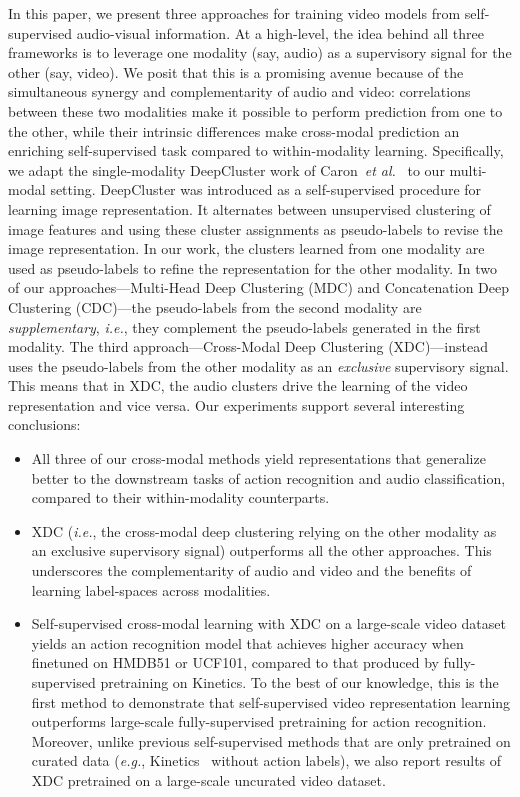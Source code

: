 \documentclass{article}
\begin{document}
\vspace{-2pt}
In this paper, we present three approaches for training video models from self-supervised audio-visual information. At a high-level, the idea behind all three frameworks is to leverage one modality (say, audio) as a supervisory signal for the other (say, video). We posit that this is a promising avenue because of the simultaneous synergy and complementarity of audio and video: correlations between these two modalities make it possible to perform prediction from one to the other, while their intrinsic differences make cross-modal prediction an enriching self-supervised task compared to within-modality learning. Specifically, we adapt the single-modality DeepCluster work of Caron~\emph{et al.}~\cite{caron2018deep} to our multi-modal setting. DeepCluster was introduced as a self-supervised procedure for learning image representation. It alternates between unsupervised clustering of image features and using these cluster assignments as pseudo-labels to revise the image representation. 
In our work, the clusters learned from one modality are used as pseudo-labels to refine the representation for the other modality. In two of our approaches---Multi-Head Deep Clustering (MDC) and Concatenation Deep Clustering (CDC)---the pseudo-labels from the second modality are {\em supplementary}, \emph{i.e.}, they complement the pseudo-labels generated in the first modality. The third approach---Cross-Modal Deep Clustering (XDC)---instead uses the pseudo-labels from the other modality as an {\em exclusive} supervisory signal. This means that in XDC, the audio clusters drive the learning of the video representation and vice versa. 
Our experiments support several interesting conclusions:
\vspace{-5pt}
\begin{itemize}[nosep, leftmargin=.42cm]
\item All three of our cross-modal methods yield representations that generalize better to the downstream tasks of action recognition and audio classification, compared to their within-modality counterparts. 
\item XDC (\emph{i.e.}, the cross-modal deep clustering relying on the other modality as an exclusive supervisory signal) outperforms all the other approaches. This underscores the complementarity of audio and video and the benefits of learning label-spaces across modalities.
\item Self-supervised cross-modal learning with XDC on a large-scale video dataset yields an action recognition model that achieves higher accuracy when finetuned on HMDB51 or UCF101, compared to that produced by fully-supervised pretraining on Kinetics. To the best of our knowledge, this is the first method to demonstrate that self-supervised video representation learning outperforms large-scale fully-supervised pretraining for action recognition. 
Moreover, unlike previous self-supervised methods that are only pretrained on curated data (\emph{e.g.}, Kinetics~\cite{kinetics} without action labels), we also report results of XDC pretrained on a large-scale uncurated video dataset.
\end{itemize}
 \vspace{-5pt}
\end{document}
